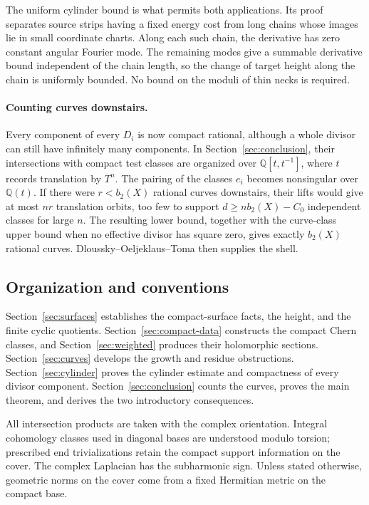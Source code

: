 \documentclass[11pt]{article}
\numberwithin{equation}{section}
\theoremstyle{definition}
\theoremstyle{remark}
\begin{document}
The uniform cylinder bound is what permits both applications. Its
proof separates source strips having a fixed energy cost from long
chains whose images lie in small coordinate charts. Along each such
chain, the derivative has zero constant angular Fourier mode. The
remaining modes give a summable derivative bound independent of the
chain length, so the change of target height along the chain is
uniformly bounded. No bound on the moduli of thin necks is required.

\paragraph{Counting curves downstairs.}
Every component of every $D_i$ is now compact rational, although a
whole divisor can still have infinitely many components. In
Section~\ref{sec:conclusion}, their intersections with compact test
classes are organized over $\mathbb Q[t,t^{-1}]$, where $t$ records
translation by $T^n$. The pairing of the classes $e_i$ becomes
nonsingular over $\mathbb Q(t)$. If there were $r<b_2(X)$ rational curves downstairs, their
lifts would give at most $nr$ translation orbits, too few to support
$d\ge n b_2(X)-C_0$ independent classes for large $n$. The resulting
lower bound, together with the curve-class upper bound when no effective
divisor has square zero, gives exactly $b_2(X)$ rational curves.
Dloussky--Oeljeklaus--Toma then supplies the shell.

\subsection*{Organization and conventions}

Section~\ref{sec:surfaces} establishes the compact-surface facts, the
height, and the finite cyclic quotients. Section~\ref{sec:compact-data}
constructs the compact Chern classes, and Section~\ref{sec:weighted}
produces their holomorphic sections. Section~\ref{sec:curves} develops
the growth and residue obstructions. Section~\ref{sec:cylinder} proves
the cylinder estimate and compactness of every divisor component.
Section~\ref{sec:conclusion} counts the curves, proves the main theorem,
and derives the two introductory consequences.

All intersection products are taken with the complex orientation.
Integral cohomology classes used in diagonal bases are understood
modulo torsion; prescribed end trivializations retain the compact
support information on the cover. The complex Laplacian has the
subharmonic sign. Unless stated otherwise, geometric norms on the
cover come from a fixed Hermitian metric on the compact base.








\end{document}
